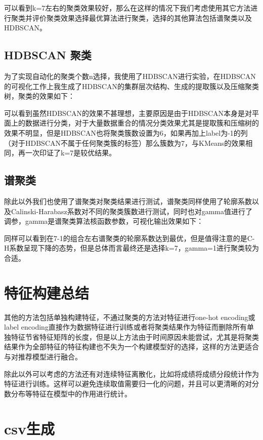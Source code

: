 可以看到k=7左右的聚类效果较好，那么在这样的情况下我们考虑使用其它方法进行聚类并评价聚类效果选择最优算法进行聚类，选择的其他算法包括谱聚类以及HDBSCAN。

\subsection{HDBSCAN 聚类}

为了实现自动化的聚类个数n选择，我使用了HDBSCAN进行实验，在HDBSCAN的可视化工作上我生成了HDBSCAN的集群层次结构、生成的提取簇以及压缩聚类树，聚类的效果如下：



可以看到虽然HDBSCAN的效果不甚理想，主要原因是由于HDBSCAN本身是对平面上的数据进行分类，对于大量数据重合的情况分类效果尤其是提取簇和压缩树的效果不明显，但是HDBSCAN也将聚类簇数设置为6，如果再加上label为-1的列（对于HDBSCAN不属于任何聚类簇的标签）那么簇数为7，与KMeans的效果相同，再一次印证了k=7是较优结果。

\subsection{谱聚类}

除此以外我们也使用了谱聚类对聚类结果进行测试，谱聚类同样使用了轮廓系数以及Calinski-Harabasz系数对不同的聚类簇数进行测试，同时也对gamma值进行了调参，gamma是谱聚类算法核函数参数，可视化输出效果如下：



同样可以看到在7-1的组合左右谱聚类的轮廓系数达到最优，但是值得注意的是C-H系数呈现下降的态势，但是总体而言最终还是选择k=7，gamma=1进行聚类较为合适。

\section{特征构建总结}

其他的方法包括单独构建特征，不通过聚类的方法对特征进行one-hot encoding或label encoding直接作为数据特征进行训练或者将聚类结果作为特征而删除所有单独特征节省特征矩阵的长度，但是以上方法由于时间原因未能尝试，尤其是将聚类结果作为全部特征的特征构建也不失为一个构建模型好的选择，这样的方法更适合与对推荐模型进行融合。

除此以外可以考虑的方法还有对连续特征离散化，比如将成绩将成绩分段统计作为特征进行训练。这样可以避免连续取值需要归一化的问题，并且可以更清晰的对分数分布等特征在模型中的作用进行统计。

\section{csv生成}


